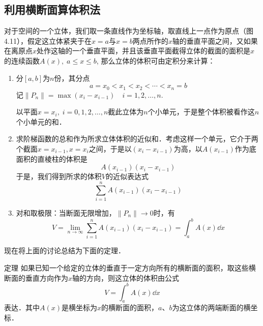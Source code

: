 \subsection{利用横断面算体积法}
对于空间的一个立体，我们取一条直线作为坐标轴，取直线上一点作为原点（图4.11），假定这立体紧夹于在$x=a$与$x=b$两点所作的$x$轴的垂直平面之间，又如果在离原点$x$处作这轴的一个垂直平面，并且该垂直平面截得立体的截面的面积是$x$的连续函数$A(x),\; a\le x\le b$, 那么立体的体积可由定积分来计算：
\begin{figure}[htp]
    \centering
{}
    \caption{}
\end{figure}

\begin{enumerate}
    \item 分$[a,b]$为$n$份，其分点
\[a=x_0<x_1<x_2<\cdots<x_n=b\]
    记$\|P_n\|=\max(x_i-x_{i-1})\quad i=1, 2,\ldots,n$.

    以平面$x=x_i,\; i=0, 1, 2,\ldots,n$截此立体为$n$个小单元，于是整个体积被看作这$n$个小单元的和．
\item  求阶梯函数的总和作为所求立体体积的近似和．考虑这样一个单元，它介于两个截面$x=x_{i-1},x=x_i$之间，于是以$(x_i-x_{i-1})$为高，以$A(x_{i-1})$作为底面积的直棱柱的体积是
  \[  A (x_{i-1}) (x_i-x_{i-1})\]
    于是，我们得到所求的体积$V$的近似表达式
    \[\sum^n_{i=1}A (x_{i-1}) (x_i-x_{i-1})\] 
    \item 对和取极限：当断面无限增加，$\|P_n\|\to 0$时，有
\[V=\lim_{n\to\infty}\sum^n_{i=1}A (x_{i-1}) (x_i-x_{i-1})=\int^b_a A(x)\dd x\]
\end{enumerate}

现在将上面的讨论总结为下面的定理．

\begin{blk}
   {定理} 如果已知一个给定的立体的垂直于一定方向所有的横断面的面积，取这些横断面的垂直方向作为$x$轴的方向，则这立体的体积由公式
\[V=\int^b_a A (x) \dd x\]
表达．其中$A(x)$是横坐标为$x$的横断面的面积，$a$、$b$为这立体的两端断面的横坐标． 
\end{blk}

